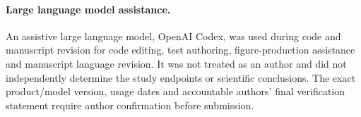 \paragraph{Large language model assistance.}
An assistive large language model, OpenAI Codex, was used during code and manuscript
revision for code editing, test authoring, figure-production assistance and manuscript
language revision. It was not treated as an author and did not independently determine the
study endpoints or scientific conclusions. The exact product/model version, usage dates and
accountable authors' final verification statement require author confirmation before
submission.
